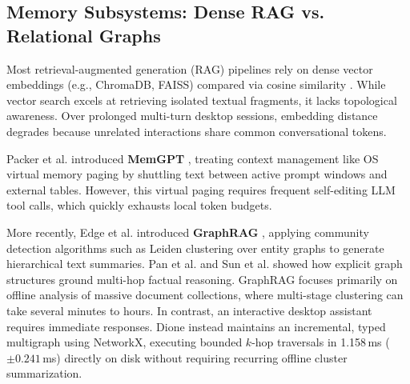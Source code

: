 \documentclass[conference,a4paper]{IEEEtran}
\begin{document}
\subsection{Memory Subsystems: Dense RAG vs. Relational Graphs}
Most retrieval-augmented generation (RAG) pipelines rely on dense vector embeddings (e.g., ChromaDB, FAISS) compared via cosine similarity \cite{lewis2020retrieval}. While vector search excels at retrieving isolated textual fragments, it lacks topological awareness. Over prolonged multi-turn desktop sessions, embedding distance degrades because unrelated interactions share common conversational tokens.

Packer et al. introduced \textbf{MemGPT} \cite{packer2023memgpt}, treating context management like OS virtual memory paging by shuttling text between active prompt windows and external tables. However, this virtual paging requires frequent self-editing LLM tool calls, which quickly exhausts local token budgets.

More recently, Edge et al. introduced \textbf{GraphRAG} \cite{edge2024graphrag}, applying community detection algorithms such as Leiden clustering over entity graphs to generate hierarchical text summaries. Pan et al. \cite{pan2024unifying} and Sun et al. \cite{sun2023thinkongraph} showed how explicit graph structures ground multi-hop factual reasoning. GraphRAG focuses primarily on offline analysis of massive document collections, where multi-stage clustering can take several minutes to hours. In contrast, an interactive desktop assistant requires immediate responses. Dione instead maintains an incremental, typed multigraph using NetworkX, executing bounded $k$-hop traversals in 1.158\,ms ($\pm 0.241$\,ms) directly on disk without requiring recurring offline cluster summarization.
\end{document}
